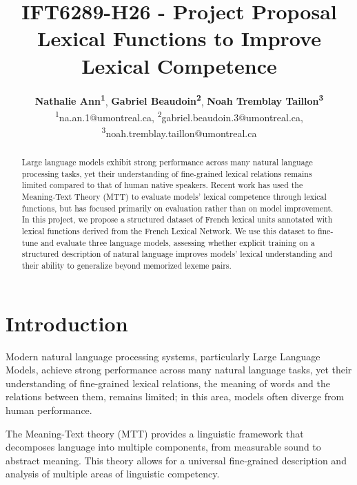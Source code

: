 \documentclass[11pt]{article}
\title{IFT6289-H26 - Project Proposal\\ Lexical Functions to Improve Lexical
  Competence}
\author{
    \textbf{Nathalie Ann\textsuperscript{1}},
    \textbf{Gabriel Beaudoin\textsuperscript{2}},
    \textbf{Noah Tremblay Taillon\textsuperscript{3}}
    \\
    \textsuperscript{1}na.an.1@umontreal.ca,
    \textsuperscript{2}gabriel.beaudoin.3@umontreal.ca,\\
    \textsuperscript{3}noah.tremblay.taillon@umontreal.ca
    }
\begin{document}
\maketitle
\begin{abstract}
Large language models exhibit strong performance across many natural language
processing tasks, yet their understanding of fine-grained lexical relations
remains limited compared to that of human native speakers. Recent work has used 
the Meaning-Text Theory (MTT) to evaluate models' lexical competence through
lexical functions, but has focused primarily on evaluation rather than
on model improvement. In this project, we propose a structured dataset of French
lexical units annotated with lexical functions derived from the French Lexical
Network. We use this dataset to fine-tune and evaluate three language models,
assessing whether explicit training on a structured description of natural
language improves models' lexical understanding and their ability to generalize
beyond memorized lexeme pairs.
\end{abstract}

\section{Introduction}
Modern natural language processing systems, particularly Large Language Models,
achieve strong performance across many natural language tasks, yet their
understanding of fine-grained lexical relations, the meaning of words and the
relations between them, remains limited; in this area, models often diverge
from human performance.


The Meaning-Text theory (MTT)
\cite{melcukVersLinguistiqueSensTexte1997} provides a linguistic framework that
decomposes language into multiple components, from measurable sound to abstract
meaning.
This theory allows for a universal
fine-grained description and analysis of multiple areas of linguistic
competency.
\end{document}
